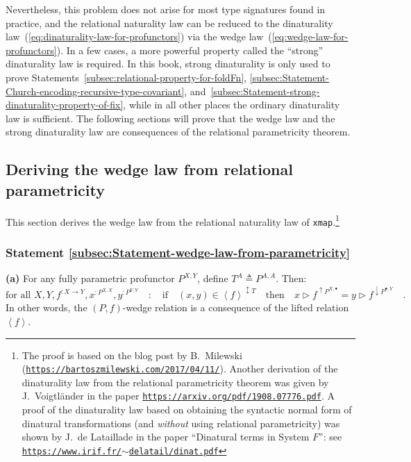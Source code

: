 Nevertheless, this problem does not arise for most type signatures
found in practice, and the relational naturality law can be reduced
to the dinaturality law~(\ref{eq:dinaturality-law-for-profunctors})
via the wedge law~(\ref{eq:wedge-law-for-profunctors}). In a few
cases, a more powerful property called the \textsf{``}strong\textsf{''} dinaturality
law is required. In this book, strong dinaturality is only used to
prove Statements~\ref{subsec:relational-property-for-foldFn}, \ref{subsec:Statement-Church-encoding-recursive-type-covariant},
and~\ref{subsec:Statement-strong-dinaturality-property-of-fix},
while in all other places the ordinary dinaturality law is sufficient.
The following sections will prove that the wedge law and the strong
dinaturality law are consequences of the relational parametricity
theorem.

\subsection{Deriving the wedge law from relational parametricity}

This section derives the wedge law from the relational naturality
law of \lstinline!xmap!.\footnote{The proof is based on the blog post by B.~Milewski
(\texttt{\href{https://bartoszmilewski.com/2017/04/11/}{https://bartoszmilewski.com/2017/04/11/}}).
Another derivation of the dinaturality law from the relational parametricity
theorem was given by J.~Voigtl\"ander
in the paper \texttt{\href{https://arxiv.org/pdf/1908.07776.pdf}{https://arxiv.org/pdf/1908.07776.pdf}}.
A proof of the dinaturality law based on obtaining the syntactic normal
form of dinatural transformations (and \emph{without} using relational
parametricity) was shown by J.~de Lataillade
in the paper \textsf{``}Dinatural terms in System $F$\textsf{''}: see \texttt{\href{https://www.irif.fr/~delatail/dinat.pdf}{https://www.irif.fr/$\sim$delatail/dinat.pdf}}}  

\subsubsection{Statement \label{subsec:Statement-wedge-law-from-parametricity}\ref{subsec:Statement-wedge-law-from-parametricity}}

\textbf{(a)} For any fully parametric profunctor $P^{X,Y}$, define
$T^{A}\triangleq P^{A,A}$. Then:
\[
\text{for all }X,Y,f^{:X\rightarrow Y},x^{:P^{X,X}},y^{:P^{Y,Y}}\quad:\quad\text{if}\quad(x,y)\in\left<f\right>^{\updownarrow T}\quad\text{then}\quad x\triangleright f^{\uparrow P^{X,\bullet}}=y\triangleright f^{\downarrow P^{\bullet,Y}}\quad.
\]
In other words, the $\left(P,f\right)$-wedge relation is a consequence
of the lifted relation $\left<f\right>$.

